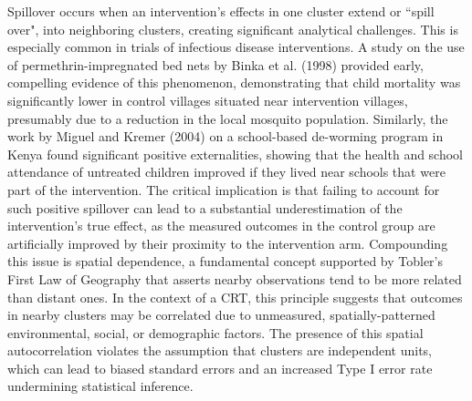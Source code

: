 \documentclass{article}[11pt]
\begin{document}
Spillover occurs when an intervention's effects in one cluster extend or ``spill over", into neighboring clusters, creating significant analytical challenges\cite{anayaizquierdo_spatial_2021}\cite{jarvis_spatial_2017}. This is especially common in trials of infectious disease interventions. A study on the use of permethrin-impregnated bed nets by Binka et al. (1998) provided early, compelling evidence of this phenomenon, demonstrating that child mortality was significantly lower in control villages situated near intervention villages, presumably due to a reduction in the local mosquito population\cite{binka_impact_1998}\cite{gimnig_effect_2003}\cite{hawley_community-wide_2003}. Similarly, the work by Miguel and Kremer (2004) on a school-based de-worming program in Kenya found significant positive externalities, showing that the health and school attendance of untreated children improved if they lived near schools that were part of the intervention\cite{miguel_worms_2004}. The critical implication is that failing to account for such positive spillover can lead to a substantial underestimation of the intervention's true effect, as the measured outcomes in the control group are artificially improved by their proximity to the intervention arm. Compounding this issue is spatial dependence, a fundamental concept supported by Tobler's First Law of Geography that asserts nearby observations tend to be more related than distant ones\cite{jarvis_spatial_2017}\cite{tobler_computer_1970}. In the context of a CRT, this principle suggests that outcomes in nearby clusters may be correlated due to unmeasured, spatially-patterned environmental, social, or demographic factors. The presence of this spatial autocorrelation violates the assumption that clusters are independent units, which can lead to biased standard errors and an increased Type I error rate undermining statistical inference\cite{getis_history_2008}\cite{cressie_statistics_1993}\cite{tobler_computer_1970}.
\end{document}
